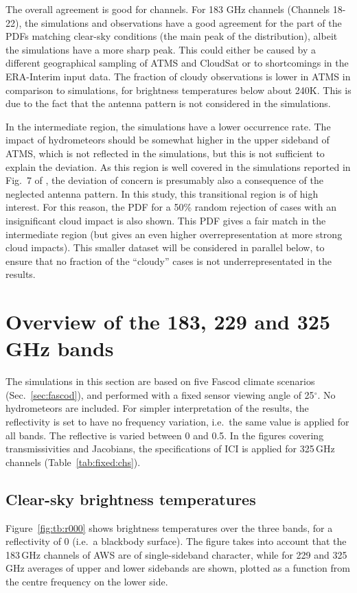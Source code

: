 \documentclass[12pt]{article}
\begin{document}
The overall agreement is good for channels. For 183 GHz channels (Channels
18-22), the simulations and observations have a good agreement for the part of
the PDFs matching clear-sky conditions (the main peak of the distribution),
albeit the simulations have a more sharp peak. This could either be caused by a
different geographical sampling of ATMS and CloudSat or to shortcomings in the
ERA-Interim input data. The fraction of cloudy observations is lower in ATMS in
comparison to simulations, for brightness temperatures below about 240\.K. This
is due to the fact that the antenna pattern is not considered in the
simulations.

In the intermediate region, the simulations have a lower occurrence rate. The
impact of hydrometeors should be somewhat higher in the upper sideband of ATMS,
which is not reflected in the simulations, but this is not sufficient to
explain the deviation. As this region is well covered in the simulations
reported in Fig.~7 of \citep{eriksson:towar:20}, the deviation of concern is
presumably also a consequence of the neglected antenna pattern. In this study,
this transitional region is of high interest. For this reason, the PDF for a
50\% random rejection of cases with an insignificant cloud impact is also
shown. This PDF gives a fair match in the intermediate region (but gives an
even higher overrepresentation at more strong cloud impacts). This smaller
dataset will be considered in parallel below, to ensure that no fraction of the
``cloudy'' cases is not underrepresentated in the results.





\section{Overview of the 183, 229 and 325\,GHz bands}
\label{sec:overview}
% 
The simulations in this section are based on five Fascod climate scenarios
(Sec.~\ref{sec:fascod}), and performed with a fixed sensor viewing angle of
25$^\circ$. No hydrometeors are included. For simpler interpretation of the
results, the reflectivity is set to have no frequency variation, i.e.\ the same
value is applied for all bands. The reflective is varied between 0 and 0.5.
In the figures covering transmissivities and Jacobians, the specifications
of ICI is applied for 325\,GHz channels (Table~\ref{tab:fixed:chs}).


\subsection{Clear-sky brightness temperatures}
%
Figure~\ref{fig:tb:r000} shows brightness temperatures over the three bands, for
a reflectivity of 0 (i.e.\ a blackbody surface). The figure takes into account
that the 183\,GHz channels of AWS are of single-sideband character, while for
229 and 325\,GHz averages of upper and lower sidebands are shown, plotted as
a function from the centre frequency on the lower side.
\end{document}
